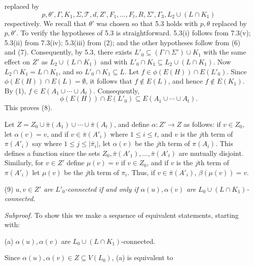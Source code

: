 \noindent replaced by
\begin{equation*}
p, \theta', \Gamma, K_1, \Sigma, \mathcal{T}, d, Z', F_1, \ldots, F_t, R, \Sigma', \Gamma_3, L_2 \cup (L \cap K_1)
\end{equation*}
respectively. We recall that $\theta'$ was chosen so that 5.3 holds with $p, \theta$ replaced by $p, \theta'$. To verify the hypotheses of 5.3 is straightforward. 5.3(i) follows from 7.3(v); 5.3(ii) from 7.3(iv); 5.3(iii) from (2); and the other hypotheses follow from (6) and (7). Consequently, by 5.3, there exists $L'_0 \subseteq (\Gamma \cap \Sigma') \cup K_1$ with the same effect on $Z'$ as $L_2 \cup (L \cap K_1)$ and with $L'_0 \cap K_1 \subseteq L_2 \cup (L \cap K_1)$. Now $L_2 \cap K_1 = L \cap K_1$, and so $L'_0 \cap K_1 \subseteq L$. Let $f \in \phi(E(H)) \cap E(L'_0)$. Since $\phi(E(H)) \cap E(L) = \emptyset$, it follows that $f \notin E(L)$, and hence $f \notin E(K_1)$. By (1), $f \in E(A_1 \cup \cdots \cup A_t)$. Consequently,
\begin{equation*}
\phi(E(H)) \cap E(L'_0) \subseteq E(A_1 \cup \cdots \cup A_t).
\end{equation*}
This proves (8).

Let $Z = Z_0 \cup \bar{\pi}(A_1) \cup \cdots \cup \bar{\pi}(A_t)$, and define $\alpha \colon Z' \to Z$ as follows: if $v \in Z_0$, let $\alpha(v) = v$, and if $v \in \bar{\pi}(A'_i)$ where $1 \le i \le t$, and $v$ is the $j$th term of $\pi(A'_i)$ say where $1 \le j \le |\bar{\pi}_i|$, let $\alpha(v)$ be the $j$th term of $\pi(A_i)$. This defines a function since the sets $Z_0, \bar{\pi}(A'_1), \ldots, \bar{\pi}(A'_t)$ are mutually disjoint. Similarly, for $v \in Z'$ define $\mu(v) = v$ if $v \in Z_0$, and if $v$ is the $j$th term of $\pi(A'_i)$ let $\mu(v)$ be the $j$th term of $\pi_i$. Thus, if $v \in \bar{\pi}(A'_i)$, $\beta(\mu(v)) = v$.

\hspace*{12pt}(9) \textit{$u, v \in Z'$ are $L'_0$-connected if and only if $\alpha(u), \alpha(v)$ are $L_0 \cup (L \cap K_1)$-connected.}

\textit{Subproof.} To show this we make a sequence of equivalent statements, starting with:

\hspace*{12pt}(a) $\alpha(u), \alpha(v)$ are $L_0 \cup (L \cap K_1)$-connected.

Since $\alpha(u), \alpha(v) \in Z \subseteq V(L_0)$, (a) is equivalent to

